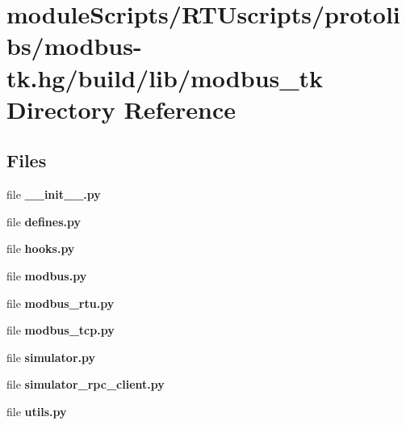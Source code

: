 \section{module\+Scripts/\+R\+T\+Uscripts/protolibs/modbus-\/tk.hg/build/lib/modbus\+\_\+tk Directory Reference}
\label{dir_e3d85f219f1e434119eda869f9ddadff}
\subsection*{Files}
\begin{DoxyCompactItemize}
\item 
file {\bf \+\_\+\+\_\+init\+\_\+\+\_\+.\+py}
\item 
file {\bf defines.\+py}
\item 
file {\bf hooks.\+py}
\item 
file {\bf modbus.\+py}
\item 
file {\bf modbus\+\_\+rtu.\+py}
\item 
file {\bf modbus\+\_\+tcp.\+py}
\item 
file {\bf simulator.\+py}
\item 
file {\bf simulator\+\_\+rpc\+\_\+client.\+py}
\item 
file {\bf utils.\+py}
\end{DoxyCompactItemize}
